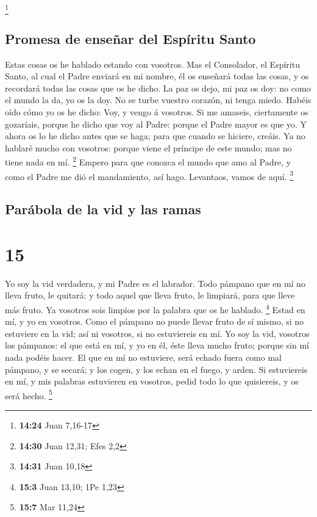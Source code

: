 \footnote{\textbf{14:24} Juan 7,16-17}

\hypertarget{promesa-de-enseuxf1ar-del-espuxedritu-santo}{%
\subsection{Promesa de enseñar del Espíritu
Santo}\label{promesa-de-enseuxf1ar-del-espuxedritu-santo}}

 Estas cosas os he hablado estando con vosotros.
 Mas el Consolador, el Espíritu Santo, al cual el Padre
enviará en mi nombre, él os enseñará todas las cosas, y os recordará
todas las cosas que os he dicho.  La paz os dejo, mi paz
os doy: no como el mundo la da, yo os la doy. No se turbe vuestro
corazón, ni tenga miedo.  Habéis oído cómo yo os he
dicho: Voy, y vengo á vosotros. Si me amaseis, ciertamente os gozaríais,
porque he dicho que voy al Padre: porque el Padre mayor es que yo.
 Y ahora os lo he dicho antes que se haga; para que
cuando se hiciere, creáis.  Ya no hablaré mucho con
vosotros: porque viene el príncipe de este mundo; mas no tiene nada en
mí. \footnote{\textbf{14:30} Juan 12,31; Efes 2,2} 
Empero para que conozca el mundo que amo al Padre, y como el Padre me
dió el mandamiento, así hago. Levantaos, vamos de aquí. \footnote{\textbf{14:31}
  Juan 10,18}

\hypertarget{paruxe1bola-de-la-vid-y-las-ramas}{%
\subsection{Parábola de la vid y las
ramas}\label{paruxe1bola-de-la-vid-y-las-ramas}}

\hypertarget{section-14}{%
\section{15}\label{section-14}}

 Yo soy la vid verdadera, y mi Padre es el labrador.
 Todo pámpano que en mí no lleva fruto, le quitará: y todo
aquel que lleva fruto, le limpiará, para que lleve más fruto.
 Ya vosotros sois limpios por la palabra que os he
hablado. \footnote{\textbf{15:3} Juan 13,10; 1Pe 1,23} 
Estad en mí, y yo en vosotros. Como el pámpano no puede llevar fruto de
sí mismo, si no estuviere en la vid; así ni vosotros, si no estuviereis
en mí.  Yo soy la vid, vosotros los pámpanos: el que está
en mí, y yo en él, éste lleva mucho fruto; porque sin mí nada podéis
hacer.  El que en mí no estuviere, será echado fuera como
mal pámpano, y se secará; y los cogen, y los echan en el fuego, y arden.
 Si estuviereis en mí, y mis palabras estuvieren en
vosotros, pedid todo lo que quisiereis, y os será hecho. \footnote{\textbf{15:7}
  Mar 11,24}

